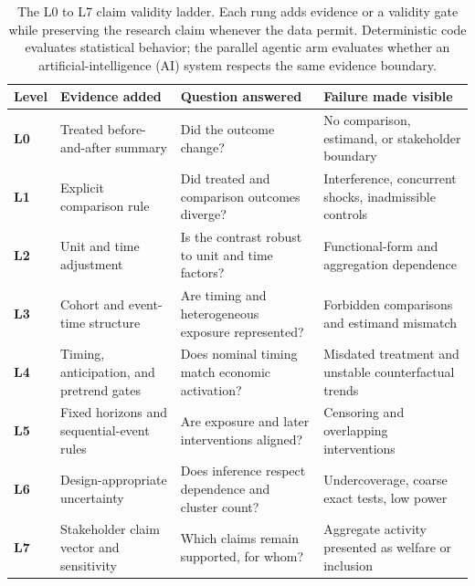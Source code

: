 \begin{table}[t]
  \centering
  \caption{The L0 to L7 claim validity ladder. Each rung adds evidence or a validity gate while preserving the research claim whenever the data permit. Deterministic code evaluates statistical behavior; the parallel agentic arm evaluates whether an artificial-intelligence (AI) system respects the same evidence boundary.}
  \label{tab:ladder}
  \footnotesize
  \setlength{\tabcolsep}{3.8pt}
  \renewcommand{\arraystretch}{1.02}
  \begin{tabularx}{\linewidth}{@{}C{0.72cm} L{2.50cm} >{\raggedright\arraybackslash}X >{\raggedright\arraybackslash}X@{}}
    \toprule
    \textbf{Level} & \textbf{Evidence added} & \textbf{Question answered} & \textbf{Failure made visible} \\
    \midrule
    \textbf{\textcolor{scopered}{L0}} & Treated before-and-after summary & Did the outcome change? & No comparison, estimand, or stakeholder boundary \\
    \textbf{\textcolor{scopered}{L1}} & Explicit comparison rule & Did treated and comparison outcomes diverge? & Interference, concurrent shocks, inadmissible controls \\
    \textbf{\textcolor{scopered}{L2}} & Unit and time adjustment & Is the contrast robust to unit and time factors? & Functional-form and aggregation dependence \\
    \textbf{\textcolor{partialamber}{L3}} & Cohort and event-time structure & Are timing and heterogeneous exposure represented? & Forbidden comparisons and estimand mismatch \\
    \textbf{\textcolor{partialamber}{L4}} & Timing, anticipation, and pretrend gates & Does nominal timing match economic activation? & Misdated treatment and unstable counterfactual trends \\
    \textbf{\textcolor{partialamber}{L5}} & Fixed horizons and sequential-event rules & Are exposure and later interventions aligned? & Censoring and overlapping interventions \\
    \textbf{\textcolor{okgreen}{L6}} & Design-appropriate uncertainty & Does inference respect dependence and cluster count? & Undercoverage, coarse exact tests, low power \\
    \textbf{\textcolor{okgreen}{L7}} & Stakeholder claim vector and sensitivity & Which claims remain supported, for whom? & Aggregate activity presented as welfare or inclusion \\
    \bottomrule
  \end{tabularx}
\end{table}
